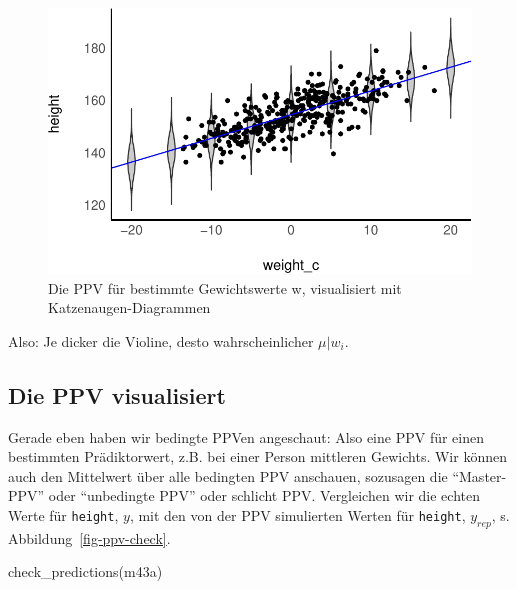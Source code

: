 \documentclass[
  a4paper,
  DIV=11]{scrreprt}
\newenvironment{Shaded}{\begin{snugshade}}{\end{snugshade}}
\newcommand{\FunctionTok}[1]{\textcolor[rgb]{0.28,0.35,0.67}{#1}}
\newcommand{\NormalTok}[1]{\textcolor[rgb]{0.00,0.23,0.31}{#1}}
\theoremstyle{definition}
\theoremstyle{remark}
\begin{document}
\begin{figure}

{\centering \includegraphics{./lineare-modelle_files/figure-pdf/fig-katzenaugen-1.pdf}

}

\caption{\label{fig-katzenaugen}Die PPV für bestimmte Gewichtswerte w,
visualisiert mit Katzenaugen-Diagrammen}

\end{figure}

Also: Je dicker die Violine, desto wahrscheinlicher \(\mu | w_i\).

\hypertarget{die-ppv-visualisiert}{%
\subsection{Die PPV visualisiert}\label{die-ppv-visualisiert}}

Gerade eben haben wir bedingte PPVen angeschaut: Also eine PPV für einen
bestimmten Prädiktorwert, z.B. bei einer Person mittleren Gewichts. Wir
können auch den Mittelwert über alle bedingten PPV anschauen, sozusagen
die ``Master-PPV'' oder ``unbedingte PPV'' oder schlicht PPV.
Vergleichen wir die echten Werte für \texttt{height}, \(y\), mit den von
der PPV simulierten Werten für \texttt{height}, \(y_{rep}\), s.
Abbildung~\ref{fig-ppv-check}.

\begin{Shaded}
\begin{Highlighting}[]
\FunctionTok{check\_predictions}\NormalTok{(m43a) }
\end{Highlighting}
\end{Shaded}
\end{document}
